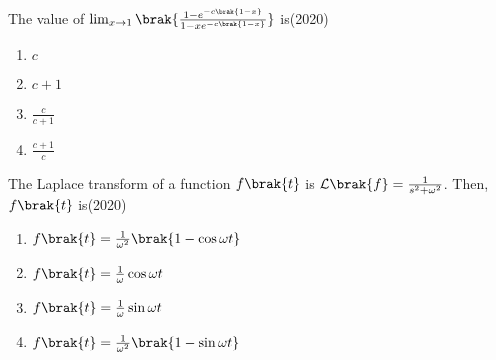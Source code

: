 \item The value of $\lim_{x\to 1}\brak{\frac{1-e^{-c\brak{1-x}}}{1-xe^{-c\brak{1-x}}}}$ is\hfill(2020)
\begin{multicols}{2}
\begin{enumerate}
\item $c$
\item $c+1$
\item $\frac{c}{c+1}$
\item $\frac{c+1}{c}$
\end{enumerate}
\end{multicols}

\item The Laplace transform of a function $f\brak{t}$ is $\mathcal{L}\brak{f}=\frac{1}{s^{2}+\omega^{2}}$. Then, $f\brak{t}$ is\hfill(2020)
\begin{multicols}{2}
\begin{enumerate}
\item $f\brak{t}=\frac{1}{\omega^{2}}\brak{1-\cos{\omega t}}$
\item $f\brak{t}=\frac{1}{\omega}\cos{\omega t}$
\item $f\brak{t}=\frac{1}{\omega}\sin{\omega t}$
\item $f\brak{t}=\frac{1}{\omega^{2}}\brak{1-\sin{\omega t}}$
\end{enumerate}
\end{multicols}